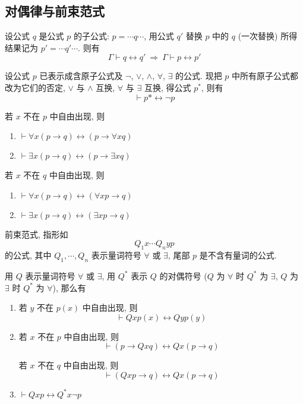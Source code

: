 \documentclass[
    color=black,
    device=normal,
    lang=cn
]{elegantnote}
\begin{document}
\subsection{对偶律与前束范式}
\begin{theorem}[子公式的等价可替换性]
    设公式 $q$ 是公式 $p$ 的子公式: $p = \cdots q \cdots$, 用公式 $q'$ 替换 $p$ 中的 $q$ (一次替换) 所得结果记为 $p' = \cdots q'\cdots$. 则有
    $$
        \Gamma\vdash q\leftrightarrow q' \ \Rightarrow\  \Gamma\vdash p\leftrightarrow p'
    $$
\end{theorem}
\begin{theorem}[对偶律]
    设公式 $p$ 已表示成含原子公式及 $\lnot$, $\lor$, $\land$, $\forall$, $\exists$ 的公式. 现把 $p$ 中所有原子公式都改为它们的否定, $\lor$ 与 $\land$ 互换, $\forall$ 与 $\exists$ 互换, 得公式 $p^*$, 则有
    $$
        \vdash p*\leftrightarrow \lnot p
    $$
\end{theorem}
\begin{proposition}
    若 $x$ 不在 $p$ 中自由出现, 则
    \begin{enumerate}[label = $\arabic*^\circ$]
        \item $\vdash \forall x (p\to q)\leftrightarrow (p\to \forall x q)$
        \item $\vdash \exists x (p\to q)\leftrightarrow (p\to \exists x q)$
    \end{enumerate}
    若 $x$ 不在 $q$ 中自由出现, 则
    \begin{enumerate}[label = $\arabic*^\circ$]
        \item $\vdash \forall x (p\to q)\leftrightarrow (\forall x p\to q)$
        \item $\vdash \exists x (p\to q)\leftrightarrow (\exists x p\to q)$
    \end{enumerate}
\end{proposition}
\begin{definition}[前束范式]
    前束范式, 指形如
    $$
        Q_1 x\cdots Q_n y p
    $$
    的公式, 其中 $Q_1, \cdots, Q_n$ 表示量词符号 $\forall$ 或 $\exists$, 尾部 $p$ 是不含有量词的公式.
\end{definition}
\begin{proposition}
    用 $Q$ 表示量词符号 $\forall$ 或 $\exists$, 用 $Q^*$ 表示 $Q$ 的对偶符号 ($Q$ 为 $\forall$ 时 $Q^*$ 为 $\exists$, $Q$ 为 $\exists$ 时 $Q^*$ 为 $\forall$), 那么有
    \begin{enumerate}[label = $\arabic*^\circ$]
        \item 若 $y$ 不在 $p(x)$ 中自由出现, 则 $$\vdash Qxp(x)\leftrightarrow Qyp(y)$$
        \item 若 $x$ 不在 $p$ 中自由出现, 则 $$\vdash (p\to Qxq)\leftrightarrow Qx(p\to q)$$

              若 $x$ 不在 $q$ 中自由出现, 则 $$\vdash (Qxp\to q)\leftrightarrow Qx(p\to q)$$
        \item $\vdash Qxp\leftrightarrow Q^*x\lnot p$
    \end{enumerate}
\end{proposition}
\end{document}
